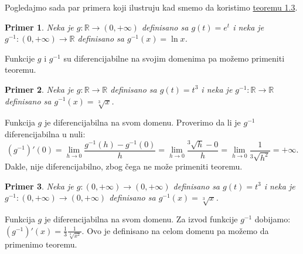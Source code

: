 \documentclass{article}
\newtheorem{prim}{Primer}[section]
\begin{document}
Pogledajmo sada par primera koji ilustruju kad smemo da
koristimo \hyperref[teorema_1.3]{teoremu 1.3}.\par

\begin{primbox}
    \label{primer_1.9}
    \begin{prim}
        Neka je $g: \mathbb{R} \longrightarrow \left(0, +\infty\right)$ definisano sa
        $g\left(t\right) = e^t$ i neka je $g^{-1}:\left(0, +\infty\right)\longrightarrow \mathbb{R}$
        definisano sa $g^{-1}\left(x\right) = \ln{x}$.
    \end{prim}
    Funkcije $g$ i $g^{-1}$
    su diferencijabilne na svojim domenima pa možemo primeniti teoremu.
\end{primbox}

\begin{primbox}
    \label{primer_1.10}
    \begin{prim}
        Neka je $g:\mathbb{R}\longrightarrow\mathbb{R}$
        definisano sa $g\left(t\right) = t^3$ i neka je $g^{-1}:\mathbb{R}\longrightarrow\mathbb{R}$
        definisano sa $g^{-1}\left(x\right) = \sqrt[3]{x}$.
    \end{prim}
    Funkcija $g$ je diferencijabilna
    na svom domenu. Proverimo da li je $g^{-1}$ diferencijabilna u nuli:
    $$\left(g^{-1}\right)'\left(0\right) = \lim\limits_{h\longrightarrow 0}\frac{g^{-1}\left(h\right) - g^{-1}\left(0\right)}{h} = \lim\limits_{h\longrightarrow 0}\frac{^3\sqrt{h} - 0}{h} = \lim\limits_{h\longrightarrow 0}\frac{1}{^3\sqrt{h^2}} = +\infty.$$
    Dakle, nije diferencijabilno, zbog čega ne može primeniti teoremu.\par
\end{primbox}

\begin{primbox}
    \label{primer_1.11}
    \begin{prim}
        Neka je $g: \left(0, +\infty\right) \longrightarrow \left(0, +\infty\right)$
        definisano sa $ g\left(t\right) = t^3$ i neka je $g^{-1}: \left(0,+\infty\right)\longrightarrow\left(0,+\infty\right)$
        definisano sa $ g^{-1}\left(x\right) = \sqrt[3]{x}$.
    \end{prim}
    Funkcija $g$ je diferencijabilna na svom domenu.
    Za izvod funkcije $g^{-1}$ dobijamo: $\left(g^{-1}\right)'\left(x\right) = \frac{1}{3}\frac{1}{\sqrt[3]{x^2}}$.
    Ovo je definisano na celom domenu pa možemo da primenimo teoremu.\par
\end{primbox}
\end{document}
